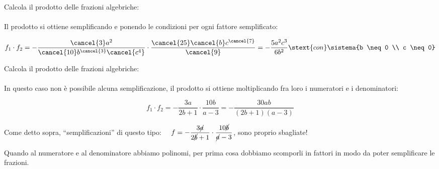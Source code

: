 
\begin{esempio}{}{}
Calcola il prodotto delle frazioni algebriche:\\
\\ [-.5em]

Il prodotto si ottiene semplificando e ponendo le condizioni per ogni 
fattore semplificato: 

\vspace{-1em}
\[f_1 \cdot f_2 =
-\dfrac{\cancel{3}a^{2}}{\cancel{10}b^{\cancel{3}}\cancel{c^{4}}}
\cdot \dfrac{\cancel{25}\cancel{b}c^{\cancel{7}}}{\cancel{9}}=
-{\dfrac{5a^{2}c^{3}}{6b^{2}}} 
\stext{ con } \sistema{b \neq 0 \\ c \neq 0}\]
\end{esempio}

\begin{esempio}{}{}
Calcola il prodotto delle frazioni algebriche:\\
\\ [-.5em]
In questo caso non è possibile alcuna semplificazione, il prodotto si 
ottiene moltiplicando fra loro i numeratori e i denominatori:

\vspace{-.5em}
\[f_1 \cdot f_2 = 
-{\dfrac{3a}{2b+1}}\cdot\dfrac{10b}{a-3}=
-{\dfrac{30ab}{(2b+1)(a-3)}}\] 
\begin{osservazione}{}{}
Come detto sopra, ``semplificazioni'' di questo tipo:~~
\(f=-{\dfrac{3\cancel{a}}{2\cancel{b}+1}}\cdot
    \dfrac{10\cancel{b}}{\cancel{a}-3}\), 
sono proprio sbagliate!
\end{osservazione}


\end{esempio}

Quando al numeratore e al denominatore abbiamo polinomi, per prima cosa 
dobbiamo scomporli in fattori in modo da poter semplificare le frazioni.

